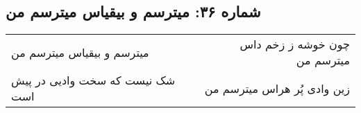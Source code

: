 \begin{center}
\section*{شماره ۳۶: میترسم و بیقیاس میترسم من}
\label{sec:036}
\begin{longtable}{l p{0.5cm} r}
میترسم و بیقیاس میترسم من
&&
چون خوشه ز زخم داس میترسم من
\\
شک نیست که سخت وادیی در پیش است
&&
زین وادی پُر هراس میترسم من
\\
\end{longtable}
\end{center}

